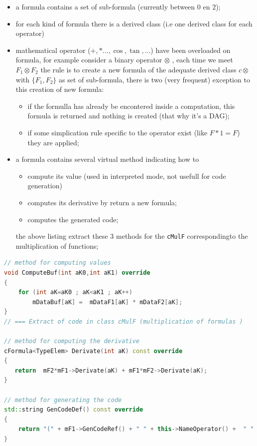 \begin{itemize}
       \item  a formula contains a set of sub-formula (currently between $0$ en $2$);

       \item  for each kind of formula there is a derived class (i.e one derived class for each operator)

       \item  mathematical operator ($+,*\dots ,\cos,\tan,\dots$) have been overloaded on formula, 
               for example consider a binary operator  $\otimes$ , each time we meet $F_1\otimes F_2$ 
		the rule is to create a new formula of the adequate derived class $c\otimes$ with  
		$\{F_1,F_2\}$ as set of sub-formula,
		there is two (very frequent) exception to this creation of new formula:

               \begin{itemize}
                    \item if the formulla has already be encontered inside a computation, this formula is returned
                          and nothing is created (that why it's a DAG);
		  \item if some simplication rule specific to the operator exist (like $F*1=F$) they are applied;
               \end{itemize}
	       
        \item  a formula contains several virtual method indicating how to 
               \begin{itemize}
		       \item  compute its value (used in interpreted mode, not usefull for code generation)
		       \item  computes its derivative by return a new formula;
		       \item  computes the generated code;
               \end{itemize}

		the above listing extract these $3$ methods for the {\tt cMulF} correspondingto the multiplication
		of functions;
\end{itemize}


\begin{lstlisting}[language=c++]
// method for computing values
void ComputeBuf(int aK0,int aK1) override
{
    for (int aK=aK0 ; aK<aK1 ; aK++)
        mDataBuf[aK] =  mDataF1[aK] * mDataF2[aK];
}
// === Extract of code in class cMulF (multiplication of formulas )

// method for computing the derivative
cFormula<TypeElem> Derivate(int aK) const override
{
   return  mF2*mF1->Derivate(aK) + mF1*mF2->Derivate(aK);
}

// method for generating the code
std::string GenCodeDef() const override 
{
    return "(" + mF1->GenCodeRef() + " " + this->NameOperator() +  " " + mF2->GenCodeRef() + ")";
}

\end{lstlisting}

